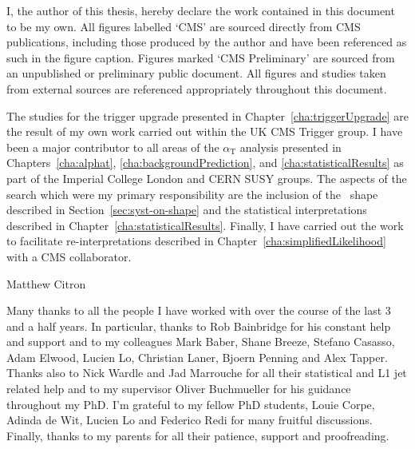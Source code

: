 \begin{declaration}
I, the author of this thesis, hereby declare the work contained in this 
document to be my own. All figures labelled `CMS' are sourced directly from CMS publications, 
including those produced by the author and have been referenced as such 
in the figure caption. Figures marked `CMS Preliminary' are sourced from an unpublished 
or preliminary public document. All figures and studies taken from external sources are referenced appropriately 
throughout this document.

The studies for the trigger upgrade presented in Chapter~\ref{cha:triggerUpgrade} are 
the result of my own work carried out within the UK CMS Trigger group. I have
been a major contributor to all areas of the $\alpha_\text{T}$ 
analysis presented in Chapters~\ref{cha:alphat}, \ref{cha:backgroundPrediction}, 
and \ref{cha:statisticalResults} as part of the Imperial College London and CERN SUSY groups.
The aspects of the search which were my primary responsibility are
the inclusion of the \mht~shape described in Section~\ref{sec:syst-on-shape} 
and the statistical interpretations described in Chapter~\ref{cha:statisticalResults}.
Finally, I have carried out the work to facilitate re-interpretations described in 
Chapter~\ref{cha:simplifiedLikelihood} with a CMS collaborator.
  \begin{flushright}
    Matthew Citron
  \end{flushright}
\end{declaration}


\begin{acknowledgements}

Many thanks to all the people I have worked with over the course of the last 3 and a half years.
In particular, thanks to Rob Bainbridge for his constant help and support and to my 
\alphat colleagues Mark Baber, Shane Breeze, Stefano Casasso, Adam Elwood, Lucien Lo, Christian Laner, Bjoern Penning
and Alex Tapper. Thanks also to Nick Wardle and Jad Marrouche for all their statistical and L1 jet
related help and to my supervisor Oliver Buchmueller for his guidance
throughout my PhD. I'm grateful to my fellow PhD students, Louie Corpe, Adinda de Wit, Lucien Lo and Federico Redi
for many fruitful discussions. Finally, thanks to my parents for all their patience, support and proofreading.

\end{acknowledgements}



\tableofcontents

\listoffigures
\listoftables
